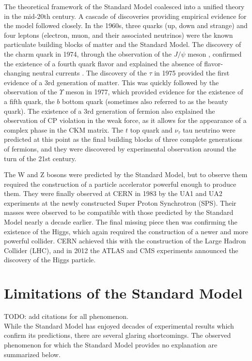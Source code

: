 The theoretical framework of the Standard Model coalesced into a unified theory in the mid-20th century. A cascade of discoveries providing empirical evidence for the model followed closely. In the 1960s, three quarks (up, down and strange) and four leptons (electron, muon, and their associated neutrinos) were the known particulate building blocks of matter and the Standard Model. The discovery of the charm quark in 1974, through the observation of the $J/\psi$ meson \cite{SLAC_J}\cite{BNL_J}, confirmed the existence of a fourth quark flavor and explained the absence of flavor-changing neutral currents \cite{griffiths}. The discovery of the $\tau$ in 1975 \cite{tau} provided the first evidence of a 3rd generation of matter. This was quickly followed by the observation of the $\Upsilon$ meson in 1977, which provided evidence for the existence of a fifth quark, the $b$ bottom quark (sometimes also referred to as the beauty quark). The existence of a 3rd generation of fermion also explained the observation of CP violation in the weak force, as it allows for the appearance of a complex phase in the CKM matrix. The $t$ top quark and $\nu_\tau$ tau neutrino were predicted at this point as the final building blocks of three complete generations of fermions, and they were discovered by experimental observation around the turn of the 21st century. \par

The W and Z bosons were predicted by the Standard Model, but to observe them required the construction of a particle accelerator powerful enough to produce them. They were finally observed at CERN in 1983 by the UA1 and UA2 experiments at the newly constructed Super Proton Synchrotron (SPS). Their masses were observed to be compatible with those predicted by the Standard Model nearly a decade earlier. The final missing piece then was confirming the existence of the Higgs, which again required the construction of a newer and more powerful collider. CERN achieved this with the construction of the Large Hadron Collider (LHC), and in 2012 the ATLAS and CMS experiments announced the discovery of the Higgs particle. 

\section{Limitations of the Standard Model}
\label{sec:lim_sm}
TODO: add citations for all phenomenon.\\

While the Standard Model has enjoyed decades of experimental results which confirm its predictions, there are several glaring shortcomings. The observed phenomenon for which the Standard Model provides no explanation are summarized below.

